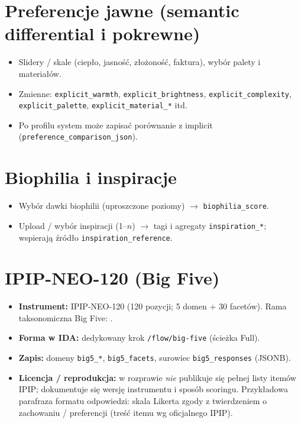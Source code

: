 \section{Preferencje jawne (semantic differential i pokrewne)}
\label{app:b:sec:explicit}

\begin{itemize}
  \item Slidery / skale (ciepło, jasność, złożoność, faktura), wybór palety i materiałów.
  \item Zmienne: \texttt{explicit\_warmth}, \texttt{explicit\_brightness}, \texttt{explicit\_complexity}, \texttt{explicit\_palette}, \texttt{explicit\_material\_*} itd.
  \item Po profilu system może zapisać porównanie z implicit (\texttt{preference\_comparison\_json}).
\end{itemize}

\section{Biophilia i inspiracje}
\label{app:b:sec:biophilia}

\begin{itemize}
  \item Wybór dawki biophilii (uproszczone poziomy) $\rightarrow$ \texttt{biophilia\_score}.
  \item Upload / wybór inspiracji (1--$n$) $\rightarrow$ tagi i agregaty \texttt{inspiration\_*}; wspierają źródło \texttt{inspiration\_reference}.
\end{itemize}

\section{IPIP-NEO-120 (Big Five)}
\label{app:b:sec:ipip}

\begin{itemize}
  \item \textbf{Instrument:} IPIP-NEO-120 (120 pozycji; 5 domen + 30 facetów). Rama taksonomiczna Big Five: \cite{john2008bigfive}.
  \item \textbf{Forma w IDA:} dedykowany krok \texttt{/flow/big-five} (ścieżka Full).
  \item \textbf{Zapis:} domeny \texttt{big5\_*}, \texttt{big5\_facets}, surowiec \texttt{big5\_responses} (JSONB).
  \item \textbf{Licencja / reprodukcja:} w rozprawie \emph{nie} publikuje się pełnej listy itemów IPIP; dokumentuje się wersję instrumentu i sposób scoringu. Przykładowa parafraza formatu odpowiedzi: skala Likerta zgody z twierdzeniem o zachowaniu / preferencji (treść itemu wg oficjalnego IPIP).
\end{itemize}

